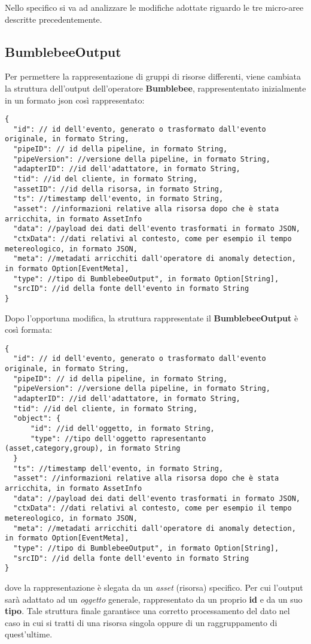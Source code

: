 Nello specifico si va ad analizzare le modifiche adottate riguardo le tre micro-aree descritte precedentemente.

\subsection{BumblebeeOutput}\label{sec:bbout}
Per permettere la rappresentazione di gruppi di risorse differenti, viene cambiata la struttura dell'output dell'operatore \textbf{Bumblebee}, rappresententato inizialmente in un formato \gls{json} così rappresentato:

\begin{verbatim}
{
  "id": // id dell'evento, generato o trasformato dall'evento originale, in formato String,
  "pipeID": // id della pipeline, in formato String,
  "pipeVersion": //versione della pipeline, in formato String,
  "adapterID": //id dell'adattatore, in formato String,
  "tid": //id del cliente, in formato String,
  "assetID": //id della risorsa, in formato String,
  "ts": //timestamp dell'evento, in formato String,
  "asset": //informazioni relative alla risorsa dopo che è stata arricchita, in formato AssetInfo
  "data": //payload dei dati dell'evento trasformati in formato JSON,
  "ctxData": //dati relativi al contesto, come per esempio il tempo metereologico, in formato JSON,
  "meta": //metadati arricchiti dall'operatore di anomaly detection, in formato Option[EventMeta],
  "type": //tipo di BumblebeeOutput", in formato Option[String],
  "srcID": //id della fonte dell'evento in formato String
}
\end{verbatim}

Dopo l'opportuna modifica, la struttura rappresentate il \textbf{BumblebeeOutput} è così formata:

\begin{verbatim}
{
  "id": // id dell'evento, generato o trasformato dall'evento originale, in formato String,
  "pipeID": // id della pipeline, in formato String,
  "pipeVersion": //versione della pipeline, in formato String,
  "adapterID": //id dell'adattatore, in formato String,
  "tid": //id del cliente, in formato String,
  "object": {
	  "id": //id dell'oggetto, in formato String,
	  "type": //tipo dell'oggetto rapresentanto (asset,category,group), in formato String
  }
  "ts": //timestamp dell'evento, in formato String,
  "asset": //informazioni relative alla risorsa dopo che è stata arricchita, in formato AssetInfo
  "data": //payload dei dati dell'evento trasformati in formato JSON,
  "ctxData": //dati relativi al contesto, come per esempio il tempo metereologico, in formato JSON,
  "meta": //metadati arricchiti dall'operatore di anomaly detection, in formato Option[EventMeta],
  "type": //tipo di BumblebeeOutput", in formato Option[String],
  "srcID": //id della fonte dell'evento in formato String
}
\end{verbatim}
dove la rappresentazione è slegata da un \textit{asset} (risorsa) specifico. Per cui l'output sarà adattato ad un \textit{oggetto} generale, rappresentato da un proprio \textbf{id} e da un suo \textbf{tipo}.
Tale struttura finale garantisce una corretto processamento del dato nel caso in cui si tratti di una risorsa singola oppure di un raggruppamento di quest'ultime.
